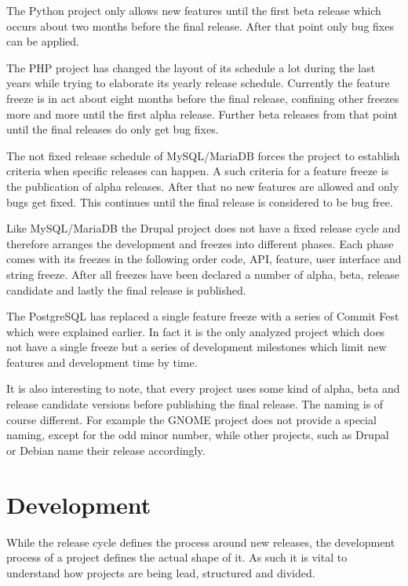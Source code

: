The Python project only allows new features until the first beta release which
occurs about two months before the final release. After that point only bug
fixes can be applied.

The PHP project has changed the layout of its schedule a lot during the last
years while trying to elaborate its yearly release schedule. Currently the
feature freeze is in act about eight months before the final release, confining
other freezes more and more until the first alpha release. Further beta
releases from that point until the final releases do only get bug fixes.

The not fixed release schedule of MySQL/MariaDB forces the project to establish
criteria when specific releases can happen. A such criteria for a feature
freeze is the publication of alpha releases. After that no new features are
allowed and only bugs get fixed. This continues until the final release
is considered to be bug free.

Like MySQL/MariaDB the Drupal project does not have a fixed release cycle and
therefore arranges the development and freezes into different phases. Each
phase comes with its freezes in the following order code, \ac{API}, feature,
user interface and string freeze. After all freezes have been declared a number
of alpha, beta, release candidate and lastly the final release is published.

The PostgreSQL has replaced a single feature freeze with a series of Commit
Fest which were explained earlier. In fact it is the only analyzed project
which does not have a single freeze but a series of development milestones
which limit new features and development time by time.

It is also interesting to note, that every project uses some kind of alpha,
beta and release candidate versions before publishing the final release. The
naming is of course different. For example the GNOME project does not provide a
special naming, except for the odd minor number, while other projects, such as
Drupal or Debian name their release accordingly.



\section{Development} %

While the release cycle defines the process around new releases, the
development process of a project defines the actual shape of it. As such it is
vital to understand how projects are being lead, structured and divided.

